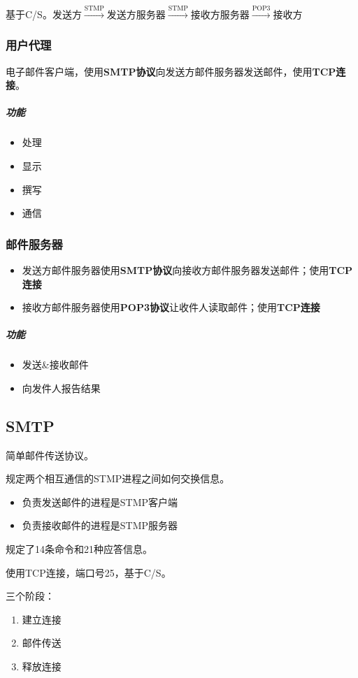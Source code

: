 基于C/S。发送方\(\xrightarrow{\text{STMP}}\)发送方服务器\(\xrightarrow{\text{STMP}}\)接收方服务器\(\xrightarrow{\text{POP3}}\)接收方

\subsubsection{用户代理}
电子邮件客户端，使用\textbf{SMTP协议}向发送方邮件服务器发送邮件，使用\textbf{TCP连接}。

\subparagraph{功能}
\begin{itemize}
    \item 处理
    \item 显示
    \item 撰写
    \item 通信
\end{itemize}

\subsubsection{邮件服务器}

\begin{itemize}
    \item 发送方邮件服务器使用\textbf{SMTP协议}向接收方邮件服务器发送邮件；使用\textbf{TCP连接}
    \item 接收方邮件服务器使用\textbf{POP3协议}让收件人读取邮件；使用\textbf{TCP连接}
\end{itemize}


\subparagraph{功能}
\begin{itemize}
    \item 发送\&接收邮件
    \item 向发件人报告结果
\end{itemize}


\subsection{SMTP}
简单邮件传送协议。

规定两个相互通信的STMP进程之间如何交换信息。
\begin{itemize}
    \item 负责发送邮件的进程是STMP客户端
    \item 负责接收邮件的进程是STMP服务器
\end{itemize}

规定了14条命令和21种应答信息。

使用TCP连接，端口号25，基于C/S。

三个阶段：\begin{enumerate}
    \item 建立连接
    \item 邮件传送
    \item 释放连接
\end{enumerate}


